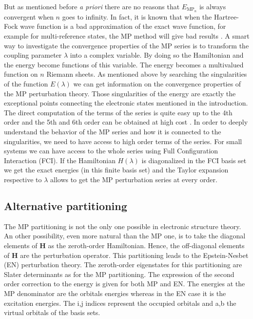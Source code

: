 \documentclass[11pt,a4paper]{article}
\newcommand{\bH}{\mathbf{H}}
\begin{document}
But as mentioned before \textit{a priori} there are no reasons that $E_{\text{MP}_{n}}$ is always convergent when $n$ goes to infinity. In fact, it is known that when the Hartree-Fock wave function is a bad approximation of the exact wave function, for example for multi-reference states, the MP method will give bad results \cite{Gill_1986, Gill_1988, Handy_1985, Lepetit_1988}. A smart way to investigate the convergence properties of the MP series is to transform the coupling parameter $\lambda$ into a complex variable. By doing so the Hamiltonian and the energy become functions of this variable. The energy becomes a multivalued function on $n$ Riemann sheets. As mentioned above by searching the singularities of the function $E(\lambda)$ we can get information on the convergence properties of the MP perturbation theory. Those singularities of the energy are exactly the exceptional points connecting the electronic states mentioned in the introduction. The direct computation of the terms of the series is quite easy up to the 4th order and the 5th and 6th order can be obtained at high cost \cite{JensenBook}. In order to deeply understand the behavior of the MP series and how it is connected to the singularities, we need to have access to high order terms of the series. For small systems we can have access to the whole series using Full Configuration Interaction (FCI). If the Hamiltonian $H(\lambda)$ is diagonalized in the FCI basis set we get the exact energies (in this finite basis set) and the Taylor expansion respective to $\lambda$ allows to get the MP perturbation series at every order.

\subsection{Alternative partitioning}\label{sec:AlterPart}

The MP partitioning is not the only one possible in electronic structure theory. An other possibility, even more natural than the MP one, is to take the diagonal elements of $\bH$ as the zeroth-order Hamiltonian. Hence, the off-diagonal elements of $\bH$ are the perturbation operator. This partitioning leads to the Epstein-Nesbet (EN) perturbation theory. The zeroth-order eigenstates for this partitioning are Slater determinants as for the MP partitioning. The expression of the second order correction to the energy is given for both MP and EN. The energies at the MP denominator are the orbitals energies whereas in the EN case it is the excitation energies. The i,j indices represent the occupied orbitals and a,b the virtual orbitals of the basis sets.
\end{document}
